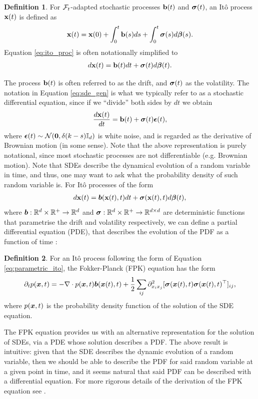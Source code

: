 \documentclass[a4paper,12pt,twoside,openright]{report}
\theoremstyle{definition}
\newtheorem{definition}{Definition}[section]
\begin{document}
\begin{definition}
    For ${\mathcal{F}}_t$-adapted stochastic processes ${\mathbf{b}}(t)$ and  ${\bm{\sigma}}(t)$, an Itô process ${\mathbf{x}}(t)$ is defined as
    \begin{align}\label{eq:ito_proc}
    {\mathbf{x}}(t) = {\mathbf{x}}(0) + \int_{0}^t {\mathbf{b}}(s) ds + \int_0^t {\bm{\sigma}}(s) d{\bm{\beta}}(s).
    \end{align}
Equation \ref{eq:ito_proc} is often notationally simplified to
    \begin{align}\label{eq:sde_gen}
        d{\mathbf{x}}(t) ={\mathbf{b}}(t) dt + {\bm{\sigma}}(t) d{\bm{\beta}}(t).
    \end{align}
\end{definition}
The process ${\mathbf{b}}(t)$ is often referred to as the drift, and ${\bm{\sigma}}(t)$ as the volatility. The notation in Equation \ref{eq:sde_gen} is what we typically refer to as a stochastic differential equation, since if we ``divide'' both sides by $dt$ we obtain
\begin{align*}
    \frac{d {\mathbf{x}}(t)}{dt} = {\mathbf{b}}(t) + {\bm{\sigma}}(t) {\bm{\epsilon}}(t),
\end{align*}
where ${\bm{\epsilon}}(t) \sim {\mathcal{N}}({\bm{0}}, \delta(k-s){\mathbb{I}_d})$ is white noise, and is regarded as the derivative of Brownian motion (in some sense). Note that the above representation is purely notational, since most stochastic processes are not differentiable (e.g. Brownian motion).
Note that SDEs describe the dynamical evolution of a random variable in time, and thus, one may want to ask what the probability density of such random variable is. For Itô processes of the form
\begin{align}\label{eq:parametric_ito}
     d{\mathbf{x}}(t) ={\bm{b}}({\mathbf{x}}(t), t) dt + {\bm{\sigma}}({\mathbf{x}}(t), t) d{\bm{\beta}}(t),
\end{align}
where ${\bm{b}} : {\mathbb{R}}^d \times {\mathbb{R}}^{+} \rightarrow {\mathbb{R}}^d$ and ${\bm{\sigma}} : {\mathbb{R}}^d \times {\mathbb{R}}^{+} \rightarrow {\mathbb{R}}^{d\times d}$ are deterministic functions that parametrise the drift and volatility respectively, we can define a partial differential equation (PDE), that describes the evolution of the PDF as a function of time \citep{sarkka2019applied}:
\begin{definition}\label{def:fpk}
    For an Itô process following the form of Equation \ref{eq:parametric_ito}, the Fokker-Planck (FPK) equation has the form
    \begin{align}\label{eq:fpk}
        \partial_{t} p({\bm{x}}, t) =-\nabla \cdot p({\bm{x}}, t){\bm{b}}({\bm{x}}(t), t) + \frac{1}{2} \sum_{ij} \partial^2_{{x_i}{x_j}}[{\bm{\sigma}}({\bm{x}}(t), t){\bm{\sigma}}({\bm{x}}(t), t)^{\top}]_{ij},
    \end{align}
    where $p({\bm{x}}, t)$ is the probability density function of the solution of the SDE equation.
\end{definition}
The FPK equation provides us with an alternative representation for the solution of SDEs, via a PDE whose solution describes a PDF. The above result is intuitive: given that the SDE describes the dynamic evolution of a random variable, then we should be able to describe the PDF for said random variable at a given point in time, and it seems natural that said PDF can be described with a differential equation. For more rigorous details of the derivation of the FPK equation see \cite{sarkka2019applied}.
\end{document}
